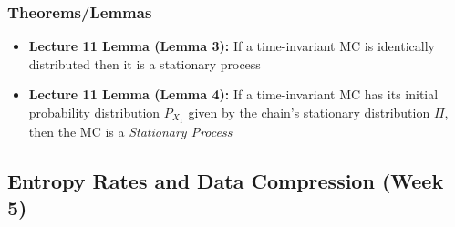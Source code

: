 \documentclass{article}
\begin{document}
\subsubsection{Theorems/Lemmas}
\begin{itemize}
    \item \textbf{Lecture 11 Lemma (Lemma 3):} If a time-invariant MC is identically distributed then it is a stationary process
    \item \textbf{Lecture 11 Lemma (Lemma 4):}  If a time-invariant MC has its initial probability distribution \(P_{X_1}\) given by the chain's stationary distribution \(\Pi\), then the MC is a \textit{Stationary Process}
\end{itemize}

\subsection{Entropy Rates and Data Compression (Week 5)}
\end{document}

